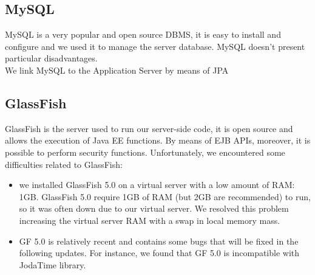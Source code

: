 \subsection{MySQL}
\label{subsec:Middleware}
MySQL is a very popular and open source DBMS, it is easy to install and configure and we used it to manage the server database. MySQL doesn't present particular disadvantages.\\
We link MySQL to the Application Server by means of JPA
\subsection{GlassFish}
\label{subsec:GlassFish}
GlassFish is the server used to run our server-side code, it is open source and allows the execution of Java EE functions. By means of EJB APIs, moreover, it is possible to perform security functions. Unfortunately, we encountered some difficulties related to GlassFish:
\begin{itemize}
\item we installed GlassFish 5.0 on a virtual server with a low amount of RAM: 1GB. GlassFish 5.0 require 1GB of RAM (but 2GB are recommended) to run, so it was often down due to our virtual server. We resolved this problem increasing the virtual server RAM with a swap in local memory mass.
\item GF 5.0 is relatively recent and contains some bugs that will be fixed in the following updates. For instance, we found that GF 5.0 is incompatible with JodaTime library. 
\end{itemize}